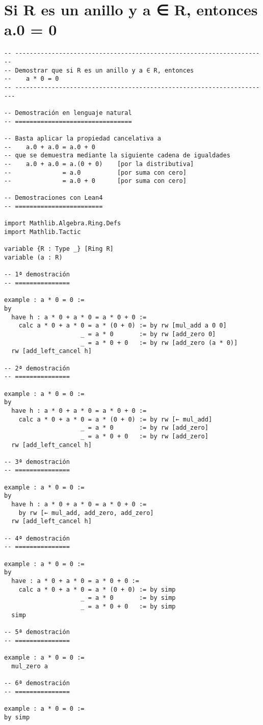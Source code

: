 \section{Si R es un anillo y a ∈ R, entonces a.0 = 0}
\label{sec:org9c1b95c}
\begin{verbatim}
-- ---------------------------------------------------------------------
-- Demostrar que si R es un anillo y a ∈ R, entonces
--    a * 0 = 0
-- ----------------------------------------------------------------------

-- Demostración en lenguaje natural
-- ================================

-- Basta aplicar la propiedad cancelativa a
--    a.0 + a.0 = a.0 + 0
-- que se demuestra mediante la siguiente cadena de igualdades
--    a.0 + a.0 = a.(0 + 0)    [por la distributiva]
--              = a.0          [por suma con cero]
--              = a.0 + 0      [por suma con cero]

-- Demostraciones con Lean4
-- ========================

import Mathlib.Algebra.Ring.Defs
import Mathlib.Tactic

variable {R : Type _} [Ring R]
variable (a : R)

-- 1ª demostración
-- ===============

example : a * 0 = 0 :=
by
  have h : a * 0 + a * 0 = a * 0 + 0 :=
    calc a * 0 + a * 0 = a * (0 + 0) := by rw [mul_add a 0 0]
                     _ = a * 0       := by rw [add_zero 0]
                     _ = a * 0 + 0   := by rw [add_zero (a * 0)]
  rw [add_left_cancel h]

-- 2ª demostración
-- ===============

example : a * 0 = 0 :=
by
  have h : a * 0 + a * 0 = a * 0 + 0 :=
    calc a * 0 + a * 0 = a * (0 + 0) := by rw [← mul_add]
                     _ = a * 0       := by rw [add_zero]
                     _ = a * 0 + 0   := by rw [add_zero]
  rw [add_left_cancel h]

-- 3ª demostración
-- ===============

example : a * 0 = 0 :=
by
  have h : a * 0 + a * 0 = a * 0 + 0 :=
    by rw [← mul_add, add_zero, add_zero]
  rw [add_left_cancel h]

-- 4ª demostración
-- ===============

example : a * 0 = 0 :=
by
  have : a * 0 + a * 0 = a * 0 + 0 :=
    calc a * 0 + a * 0 = a * (0 + 0) := by simp
                     _ = a * 0       := by simp
                     _ = a * 0 + 0   := by simp
  simp

-- 5ª demostración
-- ===============

example : a * 0 = 0 :=
  mul_zero a

-- 6ª demostración
-- ===============

example : a * 0 = 0 :=
by simp
\end{verbatim}

